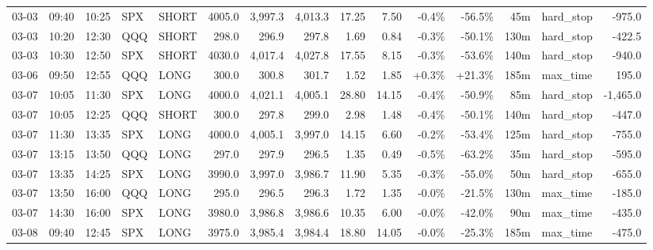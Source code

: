 \documentclass[11pt,a4paper,twoside]{article}
\begin{document}
\begin{landscape}
\begin{center}
\begin{longtable}{>{\color{txtmain}}l l l l l r r r r r r r r >{\color{txtmain}}l r}
03-03 & 09:40 & 10:25 & SPX & SHORT & 4005.0 & 3,997.3 & 4,013.3 & 17.25 & 7.50 & \textcolor{lossred}{-0.4\%} & \textcolor{lossred}{-56.5\%} & 45m & hard\_stop & \textcolor{lossred}{-975.0} \\
03-03 & 10:20 & 12:30 & QQQ & SHORT & 298.0 & 296.9 & 297.8 & 1.69 & 0.84 & \textcolor{lossred}{-0.3\%} & \textcolor{lossred}{-50.1\%} & 130m & hard\_stop & \textcolor{lossred}{-422.5} \\
03-03 & 10:30 & 12:50 & SPX & SHORT & 4030.0 & 4,017.4 & 4,027.8 & 17.55 & 8.15 & \textcolor{lossred}{-0.3\%} & \textcolor{lossred}{-53.6\%} & 140m & hard\_stop & \textcolor{lossred}{-940.0} \\
03-06 & 09:50 & 12:55 & QQQ & LONG & 300.0 & 300.8 & 301.7 & 1.52 & 1.85 & \textcolor{wingreen}{+0.3\%} & \textcolor{wingreen}{+21.3\%} & 185m & max\_time & \textcolor{wingreen}{195.0} \\
03-07 & 10:05 & 11:30 & SPX & LONG & 4000.0 & 4,021.1 & 4,005.1 & 28.80 & 14.15 & \textcolor{lossred}{-0.4\%} & \textcolor{lossred}{-50.9\%} & 85m & hard\_stop & \textcolor{lossred}{-1,465.0} \\
03-07 & 10:05 & 12:25 & QQQ & SHORT & 300.0 & 297.8 & 299.0 & 2.98 & 1.48 & \textcolor{lossred}{-0.4\%} & \textcolor{lossred}{-50.1\%} & 140m & hard\_stop & \textcolor{lossred}{-447.0} \\
03-07 & 11:30 & 13:35 & SPX & LONG & 4000.0 & 4,005.1 & 3,997.0 & 14.15 & 6.60 & \textcolor{lossred}{-0.2\%} & \textcolor{lossred}{-53.4\%} & 125m & hard\_stop & \textcolor{lossred}{-755.0} \\
03-07 & 13:15 & 13:50 & QQQ & LONG & 297.0 & 297.9 & 296.5 & 1.35 & 0.49 & \textcolor{lossred}{-0.5\%} & \textcolor{lossred}{-63.2\%} & 35m & hard\_stop & \textcolor{lossred}{-595.0} \\
03-07 & 13:35 & 14:25 & SPX & LONG & 3990.0 & 3,997.0 & 3,986.7 & 11.90 & 5.35 & \textcolor{lossred}{-0.3\%} & \textcolor{lossred}{-55.0\%} & 50m & hard\_stop & \textcolor{lossred}{-655.0} \\
03-07 & 13:50 & 16:00 & QQQ & LONG & 295.0 & 296.5 & 296.3 & 1.72 & 1.35 & \textcolor{lossred}{-0.0\%} & \textcolor{lossred}{-21.5\%} & 130m & max\_time & \textcolor{lossred}{-185.0} \\
03-07 & 14:30 & 16:00 & SPX & LONG & 3980.0 & 3,986.8 & 3,986.6 & 10.35 & 6.00 & \textcolor{lossred}{-0.0\%} & \textcolor{lossred}{-42.0\%} & 90m & max\_time & \textcolor{lossred}{-435.0} \\
03-08 & 09:40 & 12:45 & SPX & LONG & 3975.0 & 3,985.4 & 3,984.4 & 18.80 & 14.05 & \textcolor{lossred}{-0.0\%} & \textcolor{lossred}{-25.3\%} & 185m & max\_time & \textcolor{lossred}{-475.0} \\

\end{longtable}
\end{center}
\end{landscape}
\end{document}
